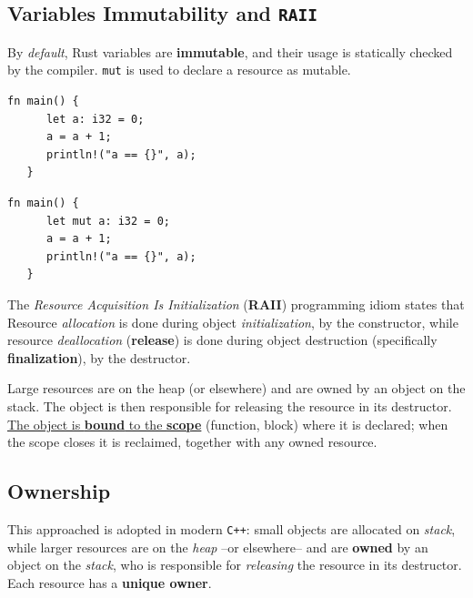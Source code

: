 \subsection{Variables Immutability and \texttt{RAII}}
By \textit{default}, Rust variables are \textbf{immutable}, and their usage is statically checked by the compiler.
\lstinline|mut| is used to declare a resource as mutable.
\begin{paracol}{2}
\begin{lstlisting}[caption={ Compilation \textit{error} \xmark}]
   fn main() {
      let a: i32 = 0;
      a = a + 1;
      println!("a == {}", a);
   }
\end{lstlisting}
\switchcolumn
\begin{lstlisting}[caption={Compilation ok \cmark}]
   fn main() {
      let mut a: i32 = 0;
      a = a + 1;
      println!("a == {}", a);
   }
\end{lstlisting}
\end{paracol}


The \textit{Resource Acquisition Is Initialization} (\textbf{RAII}) programming idiom states that Resource \textit{allocation} is done during object
\textit{initialization}, by the constructor, while resource \textit{deallocation}
(\textbf{release}) is done during object destruction (specifically
\textbf{finalization}), by the destructor.
\nl

Large resources are on the heap (or elsewhere) and are
owned by an object on the stack. The object is then
responsible for releasing the resource in its destructor.
\ul{The object is \textbf{bound} to the \textbf{scope}} (function, block) where it is
declared; when the scope closes it is reclaimed, together with
any owned resource.


\subsection{Ownership}

This approached is adopted in modern \texttt{C++}: 
small objects are allocated on \textit{stack},
while larger resources are on the \textit{heap} {--}or elsewhere{--} and are \textbf{owned} by an object on the \textit{stack},
who is responsible for \textit{releasing} the resource in its destructor.\\
Each resource has a \textbf{unique owner}.

